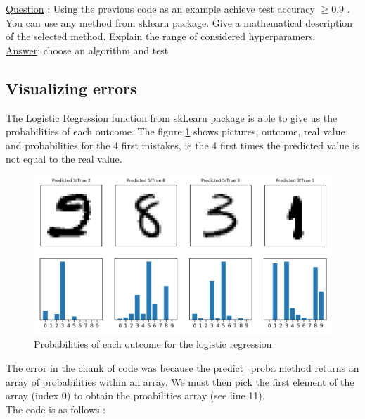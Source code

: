 \underline{Question} : Using the previous code as an example achieve test accuracy  $\geq0.9$ . You can use any method from sklearn package. Give a mathematical description of the selected method. Explain the range of considered hyperparamers.\\
\underline{Answer}: choose an algorithm and test \\

\subsection{Visualizing errors}
The Logistic Regression function from skLearn package is able to give us the probabilities of each outcome. The figure \ref{fig:probas} shows pictures, outcome, real value and probabilities for the 4 first mistakes, ie the 4 first times the predicted value is not equal to the real value. \\
 
\begin{figure}[ht]
	\centering 
	\includegraphics[scale=0.4]{Pics/probas}
	\caption{Probabilities of each outcome for the logistic regression}
	\label{fig:probas}
\end{figure}

The error in the chunk of code was because the predict\_proba method returns an array of probabilities within an array. We must then pick the first element of the array (index 0) to obtain the proabilities array (see line 11).\\

The code is as follows :
 
